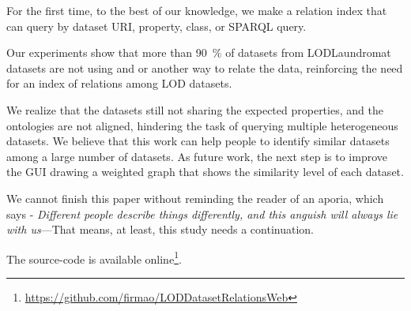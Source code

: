 \documentclass[sw]{iosart2x}
\begin{document}
For the first time, to the best of our knowledge, we make a relation index that can query by dataset URI, property, class, or SPARQL query.

Our experiments show that more than \SI{90}{\percent} of datasets from LODLaundromat datasets are not using  and  or another way to relate the data, reinforcing the need for an index of relations among LOD datasets.

We realize that the datasets still not sharing the expected properties, and the ontologies are not aligned, hindering the task of querying multiple heterogeneous datasets.
We believe that this work can help people to identify similar datasets among a large number of datasets.
As future work, the next step is to improve the GUI drawing a weighted graph that shows the similarity level of each dataset.

We cannot finish this paper without reminding the reader of an aporia, which says - \emph{Different people describe things differently, and this anguish will always lie with us}---That means, at least, this study needs a continuation.

The source-code is available online\footnote{\url{https://github.com/firmao/LODDatasetRelationsWeb}}.

\end{document}
